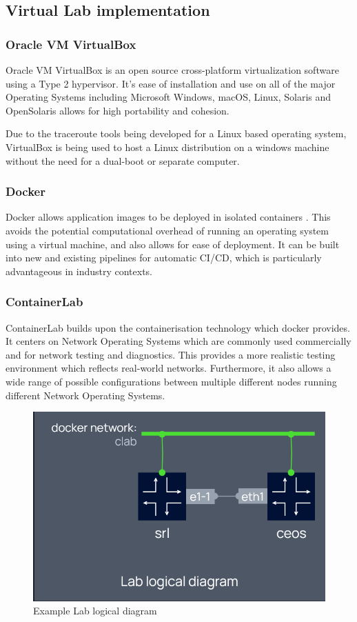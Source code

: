\subsection{Virtual Lab implementation}

\subsubsection{Oracle VM VirtualBox}
Oracle VM VirtualBox is an open source cross-platform virtualization software using a Type 2 hypervisor. \cite{VirtualWare} It's ease of installation and use on all of the major Operating Systems including Microsoft Windows, macOS, Linux, Solaris and OpenSolaris \cite{oracleVM} allows for high portability and cohesion. 

Due to the traceroute tools being developed for a Linux based operating system, VirtualBox is being used to host a Linux distribution on a windows machine without the need for a dual-boot or separate computer.

\subsubsection{Docker}
Docker allows application images to be deployed in isolated containers \cite{docker_isolate}. This avoids the potential computational overhead of running an operating system using a virtual machine, and also allows for ease of deployment. It can be built into new and existing pipelines for automatic CI/CD, which is particularly advantageous in industry contexts. 

\subsubsection{ContainerLab}

ContainerLab builds upon the containerisation technology which docker provides. It centers on Network Operating Systems which are commonly used commercially and for network testing and diagnostics. This provides a more realistic testing environment which reflects real-world networks. Furthermore, it also allows a wide range of possible configurations between multiple different nodes running different Network Operating Systems.

\begin{figure}
    \centering
    \includegraphics[width=0.5\linewidth]{images/lab_logical_diagram.png}
    \caption{Example Lab logical diagram \cite{containerlab}}
    \label{fig:lab_diagram_example}
\end{figure}

